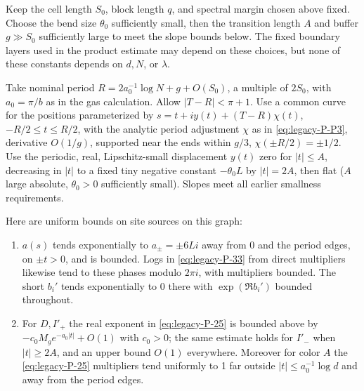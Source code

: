 Keep the cell length $S_0$, block length $q$, and spectral margin chosen above fixed. Choose the bend size $\theta_0$ sufficiently small, then the transition length $A$ and buffer $g\gg S_0$ sufficiently large to meet the slope bounds below. The fixed boundary layers used in the product estimate may depend on these choices, but none of these constants depends on $d,N$, or $\lambda$.

Take nominal period \(R=2a_0^{-1}\log N+g+O(S_0)\), a multiple of \(2S_0\), with \(a_0=\pi/b\) as in the gas calculation. Allow \(|T-R|<\pi+1\). Use a common curve for the positions parameterized by
\(s=t+i y(t)+(T-R)\chi(t)\), \( -R/2\le t\le R/2\), with the analytic period adjustment \(\chi\) as in \eqref{eq:legacy-P-P3}, derivative \(O(1/g)\), supported near the ends within \(g/3\), \(\chi(\pm R/2)=\pm1/2\). Use the periodic, real, Lipschitz-small displacement \(y(t)\) zero for \(|t|\le A\), decreasing in \(|t|\) to a fixed tiny negative constant \(-\theta_0 L\) by \(|t|=2A\), then flat (\(A\) large absolute, \(\theta_0>0\) sufficiently small). Slopes meet all earlier smallness requirements.



Here are uniform bounds on site sources on this graph:


\begin{enumerate}

\item 

\(a(s)\) tends exponentially to \(a_\pm=\pm6Li\) away from 0 and the period edges, on \(\pm t>0\), and is bounded. Logs in \eqref{eq:legacy-P-33} from direct multipliers likewise tend to these phases modulo \(2\pi i\), with multipliers bounded. The short \(b_i'\) tends exponentially to 0 there with \(\exp(\Re b_i')\) bounded throughout.



\item 

For \(D,I'_+\) the real exponent in \eqref{eq:legacy-P-25} is bounded above by \(-c_0 M_g e^{-a_0|t|}+O(1)\) with \(c_0>0\); the same estimate holds for \(I'_-\) when \(|t|\ge 2A\), and an upper bound \(O(1)\) everywhere. Moreover for color \(A\) the \eqref{eq:legacy-P-25} multipliers tend uniformly to 1 far outside \(|t|\le a_0^{-1}\log d\) and away from the period edges.



\end{enumerate}


